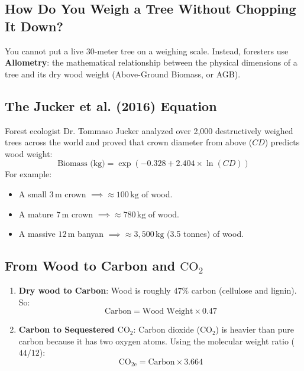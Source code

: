 \documentclass[11pt,a4paper]{article}
\begin{document}
\subsection{How Do You Weigh a Tree Without Chopping It Down?}
You cannot put a live 30-meter tree on a weighing scale. Instead, foresters use \textbf{Allometry}: the mathematical relationship between the physical dimensions of a tree and its dry wood weight (Above-Ground Biomass, or AGB).

\subsection{The Jucker et al. (2016) Equation}
Forest ecologist Dr. Tommaso Jucker analyzed over 2,000 destructively weighed trees across the world and proved that crown diameter from above ($CD$) predicts wood weight:
\begin{equation}
\text{Biomass (kg)} = \exp\left( -0.328 + 2.404 \times \ln(CD) \right)
\end{equation}
For example:
\begin{itemize}
    \item A small $3\,\text{m}$ crown $\implies \approx 100\,\text{kg}$ of wood.
    \item A mature $7\,\text{m}$ crown $\implies \approx 780\,\text{kg}$ of wood.
    \item A massive $12\,\text{m}$ banyan $\implies \approx 3,500\,\text{kg}$ (3.5 tonnes) of wood.
\end{itemize}

\subsection{From Wood to Carbon and $\text{CO}_2$}
\begin{enumerate}
    \item \textbf{Dry wood to Carbon}: Wood is roughly $47\%$ carbon (cellulose and lignin). So:
    \begin{equation}
    \text{Carbon} = \text{Wood Weight} \times 0.47
    \end{equation}
    \item \textbf{Carbon to Sequestered $\text{CO}_2$}: Carbon dioxide ($\text{CO}_2$) is heavier than pure carbon because it has two oxygen atoms. Using the molecular weight ratio ($44 / 12$):
    \begin{equation}
    \text{CO}_{2\text{e}} = \text{Carbon} \times 3.664
    \end{equation}
\end{enumerate}
\end{document}
